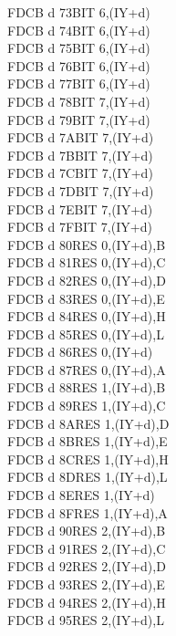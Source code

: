 \begin{multicols}{3}
{\begin{tabbing}
    FDCB d 73\>BIT 6,(IY+d)\UNDOC\\
    FDCB d 74\>BIT 6,(IY+d)\UNDOC\\
    FDCB d 75\>BIT 6,(IY+d)\UNDOC\\
    FDCB d 76\>BIT 6,(IY+d)\\
    FDCB d 77\>BIT 6,(IY+d)\UNDOC\\
    FDCB d 78\>BIT 7,(IY+d)\UNDOC\\
    FDCB d 79\>BIT 7,(IY+d)\UNDOC\\
    FDCB d 7A\>BIT 7,(IY+d)\UNDOC\\
    FDCB d 7B\>BIT 7,(IY+d)\UNDOC\\
    FDCB d 7C\>BIT 7,(IY+d)\UNDOC\\
    FDCB d 7D\>BIT 7,(IY+d)\UNDOC\\
    FDCB d 7E\>BIT 7,(IY+d)\\
    FDCB d 7F\>BIT 7,(IY+d)\UNDOC\\
    FDCB d 80\>RES 0,(IY+d),B\UNDOC\\
    FDCB d 81\>RES 0,(IY+d),C\UNDOC\\
    FDCB d 82\>RES 0,(IY+d),D\UNDOC\\
    FDCB d 83\>RES 0,(IY+d),E\UNDOC\\
    FDCB d 84\>RES 0,(IY+d),H\UNDOC\\
    FDCB d 85\>RES 0,(IY+d),L\UNDOC\\
    FDCB d 86\>RES 0,(IY+d)\\
    FDCB d 87\>RES 0,(IY+d),A\UNDOC\\
    FDCB d 88\>RES 1,(IY+d),B\UNDOC\\
    FDCB d 89\>RES 1,(IY+d),C\UNDOC\\
    FDCB d 8A\>RES 1,(IY+d),D\UNDOC\\
    FDCB d 8B\>RES 1,(IY+d),E\UNDOC\\
    FDCB d 8C\>RES 1,(IY+d),H\UNDOC\\
    FDCB d 8D\>RES 1,(IY+d),L\UNDOC\\
    FDCB d 8E\>RES 1,(IY+d)\\
    FDCB d 8F\>RES 1,(IY+d),A\UNDOC\\
    FDCB d 90\>RES 2,(IY+d),B\UNDOC\\
    FDCB d 91\>RES 2,(IY+d),C\UNDOC\\
    FDCB d 92\>RES 2,(IY+d),D\UNDOC\\
    FDCB d 93\>RES 2,(IY+d),E\UNDOC\\
    FDCB d 94\>RES 2,(IY+d),H\UNDOC\\
    FDCB d 95\>RES 2,(IY+d),L\UNDOC\\

\end{tabbing}}
\end{multicols}
